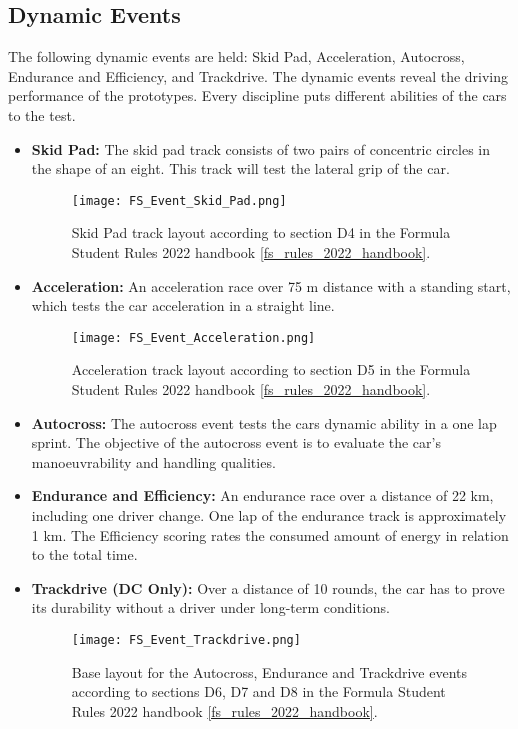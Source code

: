 \subsection{Dynamic Events}
The following dynamic events are held: Skid Pad, Acceleration, Autocross, Endurance and Efficiency, and Trackdrive.
The dynamic events reveal the driving performance of the prototypes. Every discipline puts different abilities of the cars to the test.
\begin{itemize}
    \item \textbf{Skid Pad:} The skid pad track consists of two pairs of concentric circles in the shape of an eight. This track will test the lateral grip of the car.
    \begin{figure}[H]
        \centering
        \texttt{[image: FS\_Event\_Skid\_Pad.png]}
        \caption{Skid Pad track layout according to section D4 in the Formula Student Rules 2022 handbook \ref{fs_rules_2022_handbook}.}
        \label{fig:FS Skid Pad layout}
    \end{figure}
    \item \textbf{Acceleration:} An acceleration race over 75 m distance with a standing start, which tests the car acceleration in a straight line.
    \begin{figure}[H]
        \centering
        \texttt{[image: FS\_Event\_Acceleration.png]}
        \caption{Acceleration track layout according to section D5 in the Formula Student Rules 2022 handbook \ref{fs_rules_2022_handbook}.}
        \label{fig:FS Acceleration layout}
    \end{figure}
    \item \textbf{Autocross:} The autocross event tests the cars dynamic ability in a one lap sprint. The objective of the autocross event is to evaluate the car's manoeuvrability and handling qualities.
    \item \textbf{Endurance and Efficiency:} An endurance race over a distance of 22 km, including one driver change. One lap of the endurance track is approximately 1 km. The Efficiency scoring rates the consumed amount of energy in relation to the total time.
    \item \textbf{Trackdrive (DC Only):}  Over a distance of 10 rounds, the car has to prove its durability without a driver under long-term conditions.
    \begin{figure}[H]
        \centering
        \texttt{[image: FS\_Event\_Trackdrive.png]}
        \caption{Base layout for the Autocross, Endurance and Trackdrive events according to sections D6, D7 and D8 in the Formula Student Rules 2022 handbook \ref{fs_rules_2022_handbook}.}
        \label{fig:FS Autocross, Endurance and Trackdrive layout}
    \end{figure}
\end{itemize}


